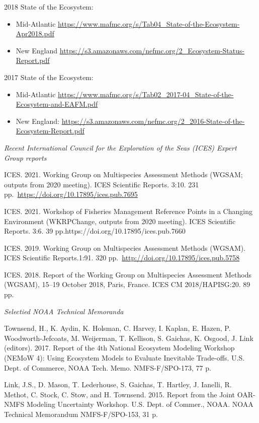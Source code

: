 \documentclass[11pt, a4paper]{awesome-cv}
\providecommand{\tightlist}{%
	\setlength{\itemsep}{0pt}\setlength{\parskip}{0pt}}
\begin{document}
2018 State of the Ecosystem:

\begin{itemize}
\tightlist
\item
  Mid-Atlantic
  \url{https://www.mafmc.org/s/Tab04_State-of-the-Ecosystem-Apr2018.pdf}
\item
  New England
  \url{https://s3.amazonaws.com/nefmc.org/2_Ecosystem-Status-Report.pdf}
\end{itemize}

2017 State of the Ecosystem:

\begin{itemize}
\tightlist
\item
  Mid-Atlantic
  \url{https://www.mafmc.org/s/Tab02_2017-04_State-of-the-Ecosystem-and-EAFM.pdf}
\item
  New England:
  \url{https://s3.amazonaws.com/nefmc.org/2_2016-State-of-the-Ecosystem-Report.pdf}
\end{itemize}

\emph{Recent International Council for the Exploration of the Seas
(ICES) Expert Group reports}

ICES. 2021. Working Group on Multispecies Assessment Methods (WGSAM;
outputs from 2020 meeting). ICES Scientific Reports. 3:10. 231
pp.~\url{https://doi.org/10.17895/ices.pub.7695}

ICES. 2021. Workshop of Fisheries Management Reference Points in a
Changing Environment (WKRPChange, outputs from 2020 meeting). ICES
Scientific Reports. 3:6. 39 pp.https://doi.org/10.17895/ices.pub.7660

ICES. 2019. Working Group on Multispecies Assessment Methods (WGSAM).
ICES Scientific Reports.1:91. 320
pp.~\url{http://doi.org/10.17895/ices.pub.5758}

ICES. 2018. Report of the Working Group on Multispecies Assessment
Methods (WGSAM), 15--19 October 2018, Paris, France. ICES CM
2018/HAPISG:20. 89 pp.

\emph{Selectied NOAA Technical Memoranda}

Townsend, H., K. Aydin, K. Holsman, C. Harvey, I. Kaplan, E. Hazen, P.
Woodworth-Jefcoats, M. Weijerman, T. Kellison, S. Gaichas, K. Osgood, J.
Link (editors). 2017. Report of the 4th National Ecosystem Modeling
Workshop (NEMoW 4): Using Ecosystem Models to Evaluate Inevitable
Trade-offs. U.S. Dept. of Commerce, NOAA Tech. Memo. NMFS-F/SPO-173, 77
p.

Link, J.S., D. Mason, T. Lederhouse, S. Gaichas, T. Hartley, J. Ianelli,
R. Methot, C. Stock, C. Stow, and H. Townsend. 2015. Report from the
Joint OAR-NMFS Modeling Uncertainty Workshop. U.S. Dept. of Commer.,
NOAA. NOAA Technical Memorandum NMFS-F/SPO-153, 31 p.
\end{document}
